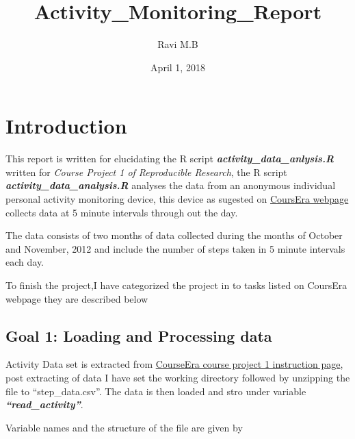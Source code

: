 \documentclass[]{article}
\title{Activity\_Monitoring\_Report}
\author{Ravi M.B}
\date{April 1, 2018}
\newenvironment{Shaded}{\begin{snugshade}}{\end{snugshade}}
\newcommand{\KeywordTok}[1]{\textcolor[rgb]{0.13,0.29,0.53}{\textbf{#1}}}
\newcommand{\DataTypeTok}[1]{\textcolor[rgb]{0.13,0.29,0.53}{#1}}
\newcommand{\StringTok}[1]{\textcolor[rgb]{0.31,0.60,0.02}{#1}}
\newcommand{\NormalTok}[1]{#1}
\begin{document}
\maketitle

\section{Introduction}\label{introduction}

This report is written for elucidating the R script
\textbf{\emph{activity\_data\_anlysis.R}} written for \emph{Course
Project 1 of Reproducible Research}, the R script
\textbf{\emph{activity\_data\_analysis.R}} analyses the data from an
anonymous individual personal activity monitoring device, this device as
sugested on
\href{https://www.coursera.org/learn/reproducible-research/peer/gYyPt/course-project-1}{CoursEra
webpage} collects data at 5 minute intervals through out the day.

The data consists of two months of data collected during the months of
October and November, 2012 and include the number of steps taken in 5
minute intervals each day.

To finish the project,I have categorized the project in to tasks listed
on CoursEra webpage they are described below

\subsection{Goal 1: Loading and Processing
data}\label{goal-1-loading-and-processing-data}

Activity Data set is extracted from
\href{https://d396qusza40orc.cloudfront.net/repdata\%2Fdata\%2Factivity.zip}{CourseEra
course project 1 instruction page}, post extracting of data I have set
the working directory followed by unzipping the file to
``step\_data.csv''. The data is then loaded and stro under variable
\textbf{\emph{``read\_activity''}}.

Variable names and the structure of the file are given by

\begin{Shaded}
\end{Shaded}
\end{document}
